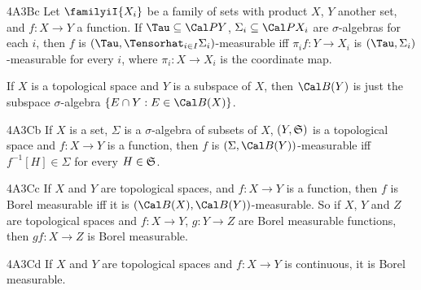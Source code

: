 \spheader 4A3Bc Let $\familyiI{X_i}$ be a family of sets with product
$X$, $Y$ another set, and $f:X\to Y$ a function.   If
$\Tau\subseteq\Cal PY$, $\Sigma_i\subseteq\Cal PX_i$ are
$\sigma$-algebras for each $i$, then $f$ is
$(\Tau,\Tensorhat_{i\in I}\Sigma_i)$-measurable iff $\pi_if:Y\to X_i$ is
$(\Tau,\Sigma_i)$-measurable for every $i$, where $\pi_i:X\to X_i$ is
the coordinate map.   

 If $X$ is a topological
space and $Y$ is a subspace of $X$, then $\Cal B(Y)$ is just the
subspace $\sigma$-algebra $\{E\cap Y:E\in\Cal B(X)\}$.

\spheader 4A3Cb If $X$ is a set, $\Sigma$ is a $\sigma$-algebra of
subsets of $X$, $(Y,\frak S)$ is a topological space and $f:X\to Y$ is a
function, then $f$ is $(\Sigma,\Cal B(Y))$-measurable iff
$f^{-1}[H]\in\Sigma$ for every $H\in\frak S$.   

\spheader 4A3Cc If $X$ and $Y$ are topological spaces, and $f:X\to Y$ is
a function, then $f$ is Borel measurable iff it is
$(\Cal B(X),\Cal B(Y))$-measurable.
So if $X$, $Y$ and $Z$ are topological spaces and $f:X\to Y$,
$g:Y\to Z$ are Borel measurable functions, then $gf:X\to Z$ is Borel
measurable.

\spheader 4A3Cd If $X$ and $Y$ are topological spaces and $f:X\to Y$
is continuous, it is Borel measurable.   


